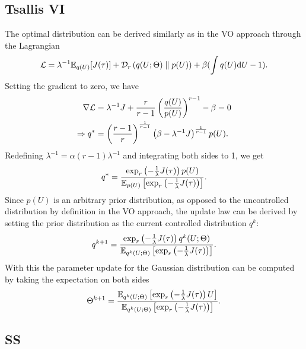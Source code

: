 \documentclass[twoside,11pt]{article}
\begin{document}
\subsection{Tsallis VI}
\label{appendix: Tsallis_VI}

The optimal distribution can be derived similarly as in the VO approach through the Lagrangian
\begin{equation}
{\cal L} = \lambda^{-1} \mathbb{E}_{q(U)}[J(\tau)] + \mathcal{D}_{r}\left({q(U;\Theta)}\parallel {p(U)}\right) + \beta(\int q(U){\mathrm d} U - 1).
\end{equation}
Setting the gradient to zero, we have
\begin{align}
\nabla {\cal L}
&= \lambda^{-1} J + \frac{ r}{r-1}\left(\frac{q(U)}{p(U)}\right)^{r-1} - \beta
=0 \\
\Rightarrow q^*
&= \left(
    \frac{r-1}{ r}\right)^{\frac{1}{r-1}}
    \left(\beta - \lambda^{-1} J \right)^{\frac{1}{r-1}} p(U) .
\end{align}
Redefining $\lambda^{-1} = \alpha(r-1) \lambda^{-1}$ and integrating both sides to 1, we get
\begin{equation}
q^* = \frac{\exp_r\left(-\frac{1}{\lambda}J(\tau)\right)p(U)}{\mathbb{E}_{p(U)}\left[\exp_r\left(-\frac{1}{\lambda}J(\tau)\right)\right]}.
\end{equation}
Since $p(U)$ is an arbitrary prior distribution, as opposed to the uncontrolled distribution by definition in the VO approach, the update law can be derived by setting the prior distribution as the current controlled distribution $q^k$:
\begin{equation}
q^{k+1} = \frac{\exp_r\left(-\frac{1}{\lambda}J(\tau)\right)q^k(U;\Theta)}{\mathbb{E}_{q^k(U;\Theta)}\left[\exp_r\left(-\frac{1}{\lambda}J(\tau)\right)\right]}.
\end{equation}
With this the parameter update for the Gaussian distribution can be computed by taking the expectation on both sides
\begin{equation}
\Theta^{k+1} = \frac{\mathbb{E}_{q^k(U;\Theta)}\left[\exp_r\left(-\frac{1}{\lambda}J(\tau)\right)U\right]}{\mathbb{E}_{q^k(U;\Theta)}\left[\exp_r\left(-\frac{1}{\lambda}J(\tau)\right)\right]}.
\end{equation}

\subsection{SS}
\label{appendix: SS}
\end{document}
